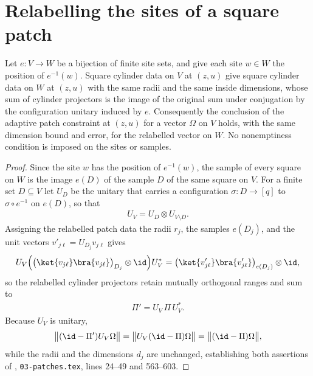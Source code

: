\section{Relabelling the sites of a square patch}
\label{sec:peps_square_patch_relabel}

\begin{lemma}
    \label{thm:peps_square_patch_relabel}
    \leanok
    Let $e\colon V\to W$ be a bijection of finite site sets, and give each site
    $w\in W$ the position of $e^{-1}(w)$. Square cylinder data on $V$ at $(z,u)$
    give square cylinder data on $W$ at $(z,u)$ with the same radii and the same
    inside dimensions, whose sum of cylinder projectors is the image of the
    original sum under conjugation by the configuration unitary induced by $e$.
    Consequently the conclusion of the adaptive patch constraint at $(z,u)$ for
    a vector $\Omega$ on $V$ holds, with the same dimension bound and error, for
    the relabelled vector on $W$. No nonemptiness condition is imposed on the
    sites or samples.
\end{lemma}

\begin{proof}
    \leanok
    Since the site $w$ has the position of $e^{-1}(w)$, the sample of every
    square on $W$ is the image $e(D)$ of the sample $D$ of the same square on
    $V$. For a finite set $D\subseteq V$ let $U_D$ be the unitary that carries a
    configuration $\sigma\colon D\to[q]$ to $\sigma\circ e^{-1}$ on $e(D)$, so
    that
    \begin{align}
        U_V=U_{D}\otimes U_{V\setminus D}.
    \end{align}
    Assigning the relabelled patch data the radii $r_j$, the samples $e(D_j)$,
    and the unit vectors $v'_{j\ell}=U_{D_j}v_{j\ell}$ gives
    \begin{align}
        U_V\Bigl(\bigl(\ket{v_{j\ell}}\bra{v_{j\ell}}\bigr)_{D_j}\otimes\id\Bigr)
        U_V^{*}
        =\bigl(\ket{v'_{j\ell}}\bra{v'_{j\ell}}\bigr)_{e(D_j)}\otimes\id,
    \end{align}
    so the relabelled cylinder projectors retain mutually orthogonal
    ranges and sum to
    \begin{align}
        \Pi'=U_V\,\Pi\,U_V^{*}.
    \end{align}
    Because $U_V$ is unitary,
    \begin{align}
        \bigl\lVert(\id-\Pi')U_V\Omega\bigr\rVert
        =\bigl\lVert U_V(\id-\Pi)\Omega\bigr\rVert
        =\bigl\lVert(\id-\Pi)\Omega\bigr\rVert,
    \end{align}
    while the radii and the dimensions $d_j$ are unchanged, establishing both
    assertions of \cite{OpenAI2026PolynomialPEPS}, \texttt{03-patches.tex},
    lines 24--49 and 563--603.
\end{proof}
